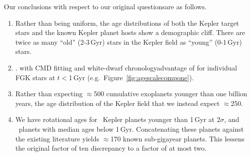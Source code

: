 \documentclass[11pt,twocolumn,tighten]{aastex63}
\begin{document}
Our conclusions with respect to our original questionsare as
follows.

\begin{enumerate}[leftmargin=*,topsep=0pt,itemsep=-0.5ex,partopsep=1ex,parsep=1ex]
  \item Rather than being uniform, the age distributions of both the
    Kepler target stars and the known Kepler planet hosts show a
    demographic cliff.  There are twice as many ``old'' (2-3\,Gyr)
    stars in the Kepler field as ``young'' (0-1\,Gyr) stars.  
\item {}.
       with  CMD fitting and white-dwarf
    chronologyadvantage of  for
    individual FGK stars at $t$$<$1\,Gyr (e.g.~Figure~\ref{fig:agescalecompone}).
  \item Rather than expecting $\approx$500 cumulative exoplanets younger than one
    billion years, the age distribution of the Kepler field
     that we  instead expect $\approx$250.
  \item We have  rotational ages for \nplyounggyrotwosigma\
    Kepler planets younger than 1\,Gyr at 2$\sigma$, and
    \nplyounggyro\ planets with median ages below 1\,Gyr.
    Concatenating these planets against the existing literature yields
    $\approx$170 known sub-gigayear planets.  This lessens the
    original factor of ten discrepancy to a factor of at most two.
\end{enumerate}
\end{document}
